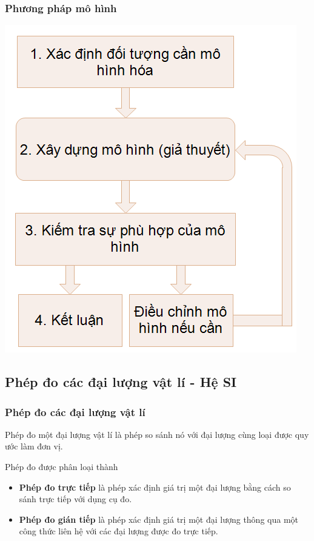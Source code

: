 \subsubsection{Phương pháp mô hình}
\begin{center}
	\includegraphics[scale=0.7]{../figs/G10-1-4}
\end{center}
	\subsection{Phép đo các đại lượng vật lí - Hệ SI}
\subsubsection{Phép đo các đại lượng vật lí}
Phép đo một đại lượng vật lí là phép so sánh nó với đại lượng cùng loại được quy ước làm đơn vị.

Phép đo được phân loại thành 
	\begin{itemize}
		\item \textbf{Phép đo trực tiếp} là phép xác định giá trị  một đại lượng bằng cách so sánh trực tiếp với dụng cụ đo. 
		\item \textbf{Phép đo gián tiếp} là phép xác định giá trị một đại lượng thông qua một công thức liên hệ với các đại lượng được đo trực tiếp.   
	\end{itemize}
